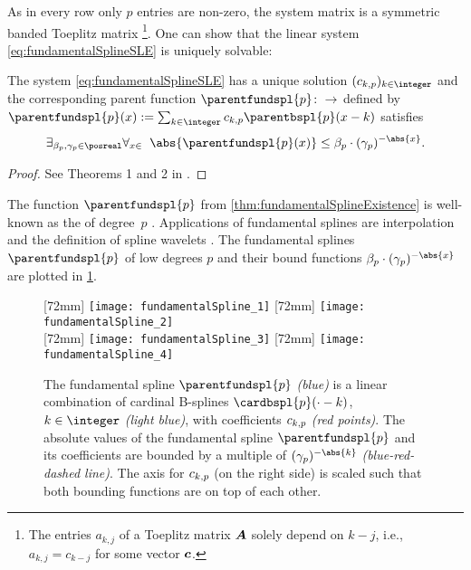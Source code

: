 As in every row only $p$ entries are non-zero,
the system matrix is a symmetric banded Toeplitz matrix%
\footnote{%
  The entries $a_{k,j}$ of a Toeplitz matrix ${\boldsymbol{A}}$
  solely depend on $k - j$, i.e.,
  $a_{k,j} = c_{k-j}$ for some vector ${\boldsymbol{c}}$.%
}.
One can show that the linear system \eqref{eq:fundamentalSplineSLE}
is uniquely solvable:

\begin{theorem}
  \label{thm:fundamentalSplineExistence}
  The system \eqref{eq:fundamentalSplineSLE} has a unique solution
  $(\fundsplcoeff{k}{p})_{k \in \integer}$ and the corresponding parent function
  $\parentfundspl{p}\colon \real \to \real$ defined by
  $\parentfundspl{p}(x) :=
  \sum_{k \in \integer} \fundsplcoeff{k}{p} \parentbspl{p}(x - k)$
  satisfies
  \begin{equation}
    \exfalarge{\beta_p, \gamma_p \in \posreal}{x \in \real}{
      \abs{\parentfundspl{p}(x)}
      \le \beta_p \cdot (\gamma_p)^{-\abs{x}}.
    }
  \end{equation}
\end{theorem}

\begin{proof}
  See Theorems 1 and 2 in \cite{Schoenberg72Cardinal}.
\end{proof}

The function $\parentfundspl{p}$ from \cref{thm:fundamentalSplineExistence}
is well-known as the  of degree~$p$
.
Applications of fundamental splines are interpolation and
the definition of spline wavelets \cite{Chui92Introduction}.
The fundamental splines $\parentfundspl{p}$ of low degrees $p$ and
their bound functions $\beta_p \cdot (\gamma_p)^{-\abs{x}}$
are plotted in \cref{fig:fundamentalSpline}.

\begin{figure}
  [72mm]{%
    \texttt{[image: fundamentalSpline\_1]}%
  }%
  \hfill%
  [72mm]{%
    \texttt{[image: fundamentalSpline\_2]}%
  }\\[4mm]%
  [72mm]{%
    \texttt{[image: fundamentalSpline\_3]}%
  }%
  \hfill%
  [72mm]{%
    \texttt{[image: fundamentalSpline\_4]}%
  }%
  \caption[%
    Fundamental splines and their B-spline coefficients%
  ]{%
    The fundamental spline $\parentfundspl{p}$ \emph{\textcolor{C0}{(blue)}}
    is a linear combination of cardinal B-splines $\cardbspl{p}({\cdot} - k)$,
    $k \in \integer$ \emph{\textcolor{C0!50}{(light blue)}},
    with coefficients $\fundsplcoeff{k}{p}$ \emph{\textcolor{C1}{(red points)}}.
    The absolute values of the fundamental spline $\parentfundspl{p}$ and
    its coefficients are bounded by a multiple of $(\gamma_p)^{-\abs{k}}$
    \emph{(\textcolor{C0}{blue}-\textcolor{C1}{red}-dashed line)}.
    The axis for $\fundsplcoeff{k}{p}$ (on the right side) is scaled such that
    both bounding functions are on top of each other.%
  }%
  \label{fig:fundamentalSpline}%
\end{figure}

